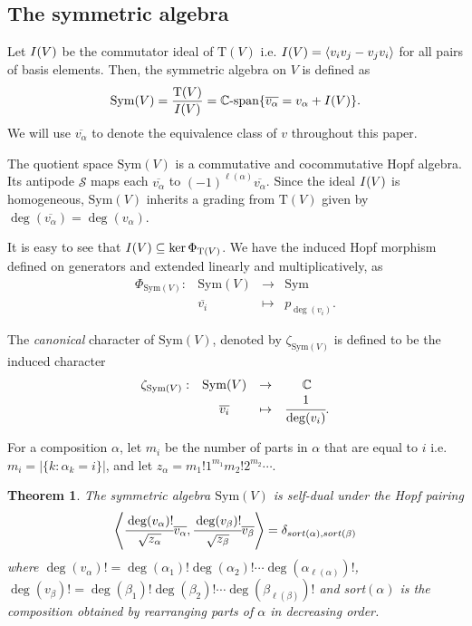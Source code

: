 \documentclass[12pt]{amsart}
\newtheorem{theorem}{Theorem}[section]
\numberwithin{equation}{section}
\newcommand{\Sym}{\mathrm{Sym}}
\newcommand{\rmT}{\mathrm{T}}
\begin{document}
\subsection{The symmetric algebra}

Let ${\rm I}(V)$ be the commutator ideal of $\rmT(V)$ i.e. ${\rm I}(V)=\langle v_iv_j-v_jv_i \rangle$ for all pairs of basis elements. Then, the symmetric algebra on $V$ is defined as
$$\Sym(V)=\frac{\rmT(V)}{{\rm I}(V)}=\mathbb{C}\text{-span}\{\overline{v_\alpha}=v_\alpha+{\rm I}(V)\}.$$
We will use $\overline{v_\alpha}$ to denote the equivalence class of $v$ throughout this paper.

The quotient space $\Sym(V)$ is a commutative and cocommutative Hopf algebra. Its antipode $\mathcal{S}$ maps each $\overline{v_{\alpha}}$ to $(-1)^{\ell(\alpha)} \overline{v_{\alpha}}$. Since the ideal ${\rm I}(V)$ is homogeneous, $\Sym(V)$ inherits a grading from $\rmT(V)$ given by $\deg(\overline{v_\alpha})=\deg(v_\alpha)$.

It is easy to see that ${\rm I}(V)\subseteq\ker\Phi_{\rmT(V)}$. We have the induced Hopf morphism defined on generators and extended linearly and multiplicatively, as
$$\begin{array}{cccc}
\Phi_{\Sym(V)}:&\Sym(V)&\rightarrow& \Sym\\
& \overline{v_i} & \mapsto & p_{\deg(v_i)}.
\end{array}$$

The \textit{canonical} character of $\Sym(V)$, denoted by $\zeta_{\Sym(V)}$ is defined to be the induced character
$$\begin{array}{cccc}
\zeta_{\Sym(V)}:&\Sym(V)&\rightarrow& \mathbb{C}\\
& \overline{v_i} & \mapsto & \cfrac{1}{\deg(v_i)}.
\end{array}$$

For a composition $\alpha$, let $m_i$ be the number of parts in $\alpha$ that are equal to $i$ i.e. $m_i=|\{k:\alpha_k=i\}|$, and let $z_\alpha=m_1!1^{m_1}m_2!2^{m_2}\cdots$. 

\begin{theorem}\label{thm:duality}
	The symmetric algebra $\Sym(V)$ is self-dual under the Hopf pairing
	$$\left\langle \cfrac{\deg(v_\alpha)!}{\sqrt{z_\alpha}}\overline{v_\alpha},\cfrac{\deg(v_\beta)!}{\sqrt{z_\beta}}\overline{v_\beta} \right\rangle=\delta_{{\rm sort}(\alpha),{\rm sort}(\beta)}$$
	where $\deg(v_\alpha)!=\deg(\alpha_1)!\deg(\alpha_2)!\cdots\deg(\alpha_{\ell(\alpha)})!$, $\deg(v_\beta)!=\deg(\beta_1)!\deg(\beta_2)!\cdots\deg(\beta_{\ell(\beta)})!$ and sort$(\alpha)$ is the composition obtained by rearranging parts of $\alpha$ in decreasing order.
\end{theorem}
\end{document}
